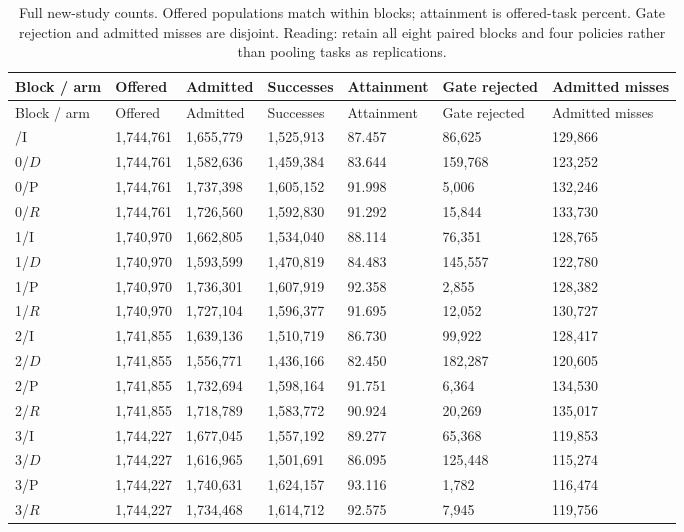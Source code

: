 \documentclass[12pt,a4paper]{article}
\begin{document}
\begingroup
\singlespacing\footnotesize\setlength{\tabcolsep}{3pt}
\renewcommand{\thetable}{E1}
\begin{xltabular}{\textwidth}{@{}YYYYYYY@{}}
\caption[All confirmation cells]{Full new-study counts. Offered populations match within blocks; attainment is offered-task percent. Gate rejection and admitted misses are disjoint. Reading: retain all eight paired blocks and four policies rather than pooling tasks as replications.}\label{tab:E1} \\
\toprule
Block / arm & Offered & Admitted & Successes & Attainment & Gate rejected & Admitted misses \\
\midrule\endfirsthead
\toprule
Block / arm & Offered & Admitted & Successes & Attainment & Gate rejected & Admitted misses \\
\midrule\endhead
\bottomrule{}/I & 1,744,761 & 1,655,779 & 1,525,913 & 87.457 & 86,625 & 129,866 \\
0/$D$ & 1,744,761 & 1,582,636 & 1,459,384 & 83.644 & 159,768 & 123,252 \\
0/P & 1,744,761 & 1,737,398 & 1,605,152 & 91.998 & 5,006 & 132,246 \\
0/$R$ & 1,744,761 & 1,726,560 & 1,592,830 & 91.292 & 15,844 & 133,730 \\
1/I & 1,740,970 & 1,662,805 & 1,534,040 & 88.114 & 76,351 & 128,765 \\
1/$D$ & 1,740,970 & 1,593,599 & 1,470,819 & 84.483 & 145,557 & 122,780 \\
1/P & 1,740,970 & 1,736,301 & 1,607,919 & 92.358 & 2,855 & 128,382 \\
1/$R$ & 1,740,970 & 1,727,104 & 1,596,377 & 91.695 & 12,052 & 130,727 \\
2/I & 1,741,855 & 1,639,136 & 1,510,719 & 86.730 & 99,922 & 128,417 \\
2/$D$ & 1,741,855 & 1,556,771 & 1,436,166 & 82.450 & 182,287 & 120,605 \\
2/P & 1,741,855 & 1,732,694 & 1,598,164 & 91.751 & 6,364 & 134,530 \\
2/$R$ & 1,741,855 & 1,718,789 & 1,583,772 & 90.924 & 20,269 & 135,017 \\
3/I & 1,744,227 & 1,677,045 & 1,557,192 & 89.277 & 65,368 & 119,853 \\
3/$D$ & 1,744,227 & 1,616,965 & 1,501,691 & 86.095 & 125,448 & 115,274 \\
3/P & 1,744,227 & 1,740,631 & 1,624,157 & 93.116 & 1,782 & 116,474 \\
3/$R$ & 1,744,227 & 1,734,468 & 1,614,712 & 92.575 & 7,945 & 119,756 \\

\end{xltabular}
\end{document}
